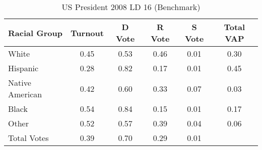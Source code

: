 \begin{table}[htb]
\begin{center}
\caption{US President 2008 LD 16 (Benchmark)}
\label{pres08_vap_ld_16_benchmark}
\begin{tabular}{lccccc}
  \hline
Racial Group & Turnout & D Vote & R Vote & S Vote & Total VAP \\ 
  \hline
White & 0.45 & 0.53 & 0.46 & 0.01 & 0.30 \\ 
  Hispanic & 0.28 & 0.82 & 0.17 & 0.01 & 0.45 \\ 
  Native American & 0.42 & 0.60 & 0.33 & 0.07 & 0.03 \\ 
  Black & 0.54 & 0.84 & 0.15 & 0.01 & 0.17 \\ 
  Other & 0.52 & 0.57 & 0.39 & 0.04 & 0.06 \\ 
  Total Votes & 0.39 & 0.70 & 0.29 & 0.01 &  \\ 
   \hline
\end{tabular}
\end{center}
\end{table}
